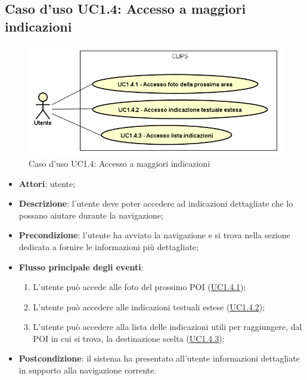 \documentclass[../AnalisiDeiRequisiti.tex]{subfiles}
\begin{document}
\subsection{Caso d'uso UC1.4: Accesso a maggiori indicazioni}

        \begin{figure}[!h]
            \centering
            \includegraphics[scale=0.95, width=\textwidth]{img/UC1-4.png}
            \caption{Caso d'uso UC1.4: Accesso a maggiori indicazioni}\label{fig:UC1.4} 
        \end{figure}
\begin{itemize}
\item \textbf{Attori}: utente;
\item \textbf{Descrizione}: l'utente deve poter accedere ad indicazioni dettagliate che lo possano aiutare durante la navigazione; 
      \item \textbf{Precondizione}: l'utente ha avviato la navigazione e si trova nella sezione dedicata a fornire le informazioni più dettagliate;

        \item \textbf{Flusso principale degli eventi}:
          \begin{enumerate}
          \item L'utente può accede alle foto del prossimo POI (\hyperlink{UC1.4.1}{UC1.4.1});
          \item L'utente può accedere alle indicazioni testuali estese (\hyperlink{UC1.4.2}{UC1.4.2});
          \item L'utente può accedere alla lista delle indicazioni utili per raggiungere, dal POI in cui si trova, la destinazione scelta (\hyperlink{UC1.4.3}{UC1.4.3});

      \end{enumerate}
    \item \textbf{Postcondizione}: il sistema ha presentato all'utente informazioni dettagliate in supporto alla navigazione corrente.
  \end{itemize}
\hypertarget{UC1.4.1}{}
\end{document}
